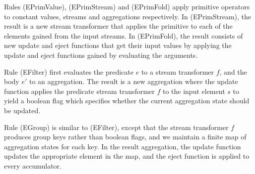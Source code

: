 
Rules (EPrimValue), (EPrimStream) and (EPrimFold) apply primitive operators to constant values, streams and aggregations respectively.
In (EPrimStream), the result is a new stream transformer that applies the primitive to each of the elements gained from the input streams.
In (EPrimFold), the result consists of new update and eject functions that get their input values by applying the update and eject functions gained by evaluating the arguments.


Rule (EFilter) first evaluates the predicate $e$ to a stream transformer $f$, and the body $e'$ to an aggregation. The result is a new aggregation where the update function applies the predicate stream transformer $f$ to the input element $s$ to yield a boolean flag which specifies whether the current aggregation state should be updated.

Rule (EGroup) is similar to (EFilter), except that the stream transformer $f$ produces group keys rather than boolean flags, and we maintain a finite map of aggregation states for each key. In the result aggregation, the update function updates the appropriate element in the map, and the eject function is applied to every accumulator. 


